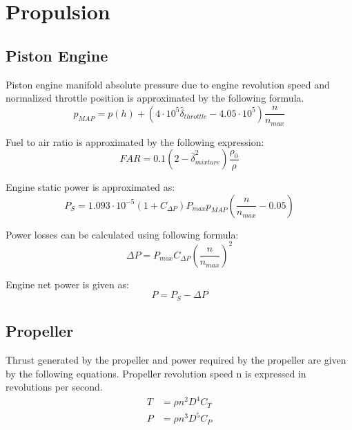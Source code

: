 \chapter{Propulsion}

\section{Piston Engine}

Piston engine manifold absolute pressure due to engine revolution speed and normalized throttle position is approximated by the following formula.
\begin{equation}
  p_{MAP}
  =
  p \left( h \right)
  +
  \left(
    4 \cdot 10^5 \hat \delta_{throttle}
    -
    4.05 \cdot 10^5
  \right)
  \frac{n}{n_{max}}
\end{equation}

Fuel to air ratio is approximated by the following expression: \cite{Allerton2009}
\begin{equation}
  FAR = 0.1 \left( 2 - {\hat \delta}_{mixture}^2 \right) \frac{\rho_0}{\rho}
\end{equation}

Engine static power is approximated as:
\begin{equation}
  P_S =
  1.093 \cdot 10^{-5} \left( 1 + C_{\Delta P} \right) P_{max} p_{MAP}
  \left( \frac{n}{n_{max}} - 0.05 \right)
\end{equation}

Power losses can be calculated using following formula:
\begin{equation}
  \Delta P = P_{max} C_{\Delta P} \left( \frac{n}{n_{max}} \right)^2
\end{equation}

Engine net power is given as:
\begin{equation}
  P = P_S - \Delta P
\end{equation}

\section{Propeller}

Thrust generated by the propeller and power required by the propeller are given by the following equations. \cite{Allerton2009, Raymer1992} Propeller revolution speed n is expressed in revolutions per second.
\begin{align}
  T &= \rho n^2 D^4 C_T \\
  P &= \rho n^3 D^5 C_P
\end{align}

